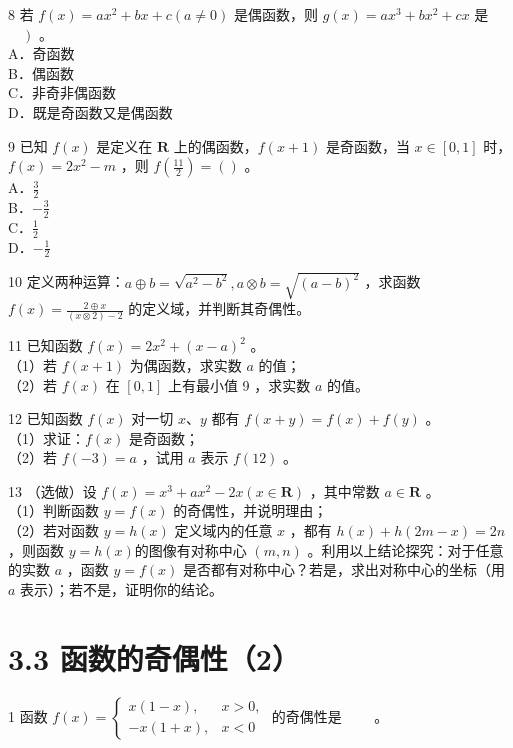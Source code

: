 \documentclass[10pt]{article}
\begin{document}
8 若 \(f(x)=a x^{2}+b x+c(a \neq 0)\) 是偶函数，则 \(g(x)=a x^{3}+b x^{2}+c x\) 是 \(\left.\quad\right)\) 。\\
A．奇函数\\
B．偶函数\\
C．非奇非偶函数\\
D．既是奇函数又是偶函数

9 已知 \(f(x)\) 是定义在 \(\mathbf{R}\) 上的偶函数，\(f(x+1)\) 是奇函数，当 \(x \in[0,1]\) 时，\(f(x)=2 x^{2}-m\) ，则 \(f\left(\frac{11}{2}\right)=()\) 。\\
A．\(\frac{3}{2}\)\\
B．\(-\frac{3}{2}\)\\
C．\(\frac{1}{2}\)\\
D．\(-\frac{1}{2}\)

10 定义两种运算：\(a \oplus b=\sqrt{a^{2}-b^{2}}, a \otimes b=\sqrt{(a-b)^{2}}\) ，求函数 \(f(x)=\frac{2 \oplus x}{(x \otimes 2)-2}\) 的定义域，并判断其奇偶性。

11 已知函数 \(f(x)=2 x^{2}+(x-a)^{2}\) 。\\
（1）若 \(f(x+1)\) 为偶函数，求实数 \(a\) 的值；\\
（2）若 \(f(x)\) 在 \([0,1]\) 上有最小值 9 ，求实数 \(a\) 的值。

12 已知函数 \(f(x)\) 对一切 \(x 、 y\) 都有 \(f(x+y)=f(x)+f(y)\) 。\\
（1）求证：\(f(x)\) 是奇函数；\\
（2）若 \(f(-3)=a\) ，试用 \(a\) 表示 \(f(12)\) 。

13 （选做）设 \(f(x)=x^{3}+a x^{2}-2 x(x \in \mathbf{R})\) ，其中常数 \(a \in \mathbf{R}\) 。\\
（1）判断函数 \(y=f(x)\) 的奇偶性，并说明理由；\\
（2）若对函数 \(y=h(x)\) 定义域内的任意 \(x\) ，都有 \(h(x)+h(2 m-x)=2 n\) ，则函数 \(y=h(x)\)的图像有对称中心 \((m, n)\) 。利用以上结论探究：对于任意的实数 \(a\) ，函数 \(y=f(x)\) 是否都有对称中心？若是，求出对称中心的坐标（用 \(a\) 表示）；若不是，证明你的结论。

\section*{3.3 函数的奇偶性（2）}
1 函数 \(f(x)=\left\{\begin{array}{ll}x(1-x), & x>0, \\ -x(1+x), & x<0\end{array}\right.\) 的奇偶性是 \(\qquad\)。
\end{document}
